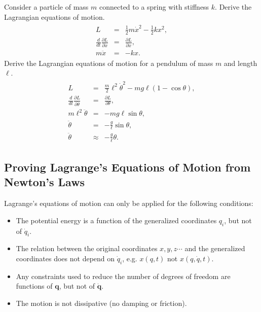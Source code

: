 \documentclass[letterpaper,10pt,english]{sphinxmanual}
\begin{document}
Consider a particle of mass \(m\) connected to a spring with stiffness \(k\). Derive the Lagrangian equations of motion.
\begin{equation*}
\begin{split}
\begin{eqnarray*}
L&=&\frac{1}{2}m\dot{x}^2-\frac{1}{2}kx^2,\\
\frac{d}{dt}\frac{\partial L}{\partial \dot{x}}&=&\frac{\partial L}{\partial x},\\
m\ddot{x}&=&-kx.
\end{eqnarray*}
\end{split}
\end{equation*}
Derive the Lagrangian equations of motion for a pendulum of mass \(m\)
and length \(\ell\).
\begin{equation*}
\begin{split}
\begin{eqnarray*}
L&=&\frac{m}{2}\ell^2\dot{\theta}^2-mg\ell(1-\cos\theta),\\
\frac{d}{dt}\frac{\partial L}{\partial \dot{\theta}}&=&\frac{\partial L}{\partial \theta},\\
m\ell^2\ddot{\theta}&=&-mg\ell\sin\theta,\\
\ddot{\theta}&=&-\frac{g}{\ell}\sin\theta,\\
\ddot{\theta}&\approx&-\frac{g}{\ell}\theta.
\end{eqnarray*}
\end{split}
\end{equation*}

\subsection{Proving Lagrange’s Equations of Motion from Newton’s Laws}
\label{\detokenize{chapter1:proving-lagrange-s-equations-of-motion-from-newton-s-laws}}
Lagrange’s equations of motion can only be applied for the following conditions:
\begin{itemize}
\item {} 
The potential energy is a function of the generalized coordinates \(q_i\), but not of \(\dot{q}_i\).

\item {} 
The relation between the original coordinates \(x,y,z\cdots\) and the generalized coordinates does not depend on \(\dot{q}_i\), e.g. \(x(q,t)\) not \(x(q,\dot{q},t)\).

\item {} 
Any constraints used to reduce the number of degrees of freedom are functions of \(\boldsymbol{q}\), but not of \(\dot{\boldsymbol{q}}\).

\item {} 
The motion is not dissipative (no damping or friction).

\end{itemize}
\end{document}
